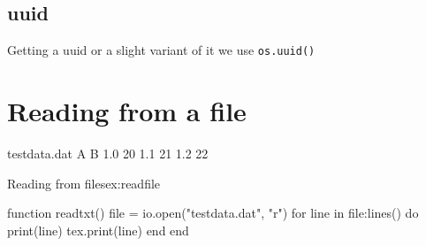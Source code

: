 \subsection{uuid}
Getting a uuid or a slight variant of it we use \lstinline!os.uuid()!

\section{Reading from a file}


\usepackage{luatextra}


\begin{filecontents}{testdata.dat}
  A  B
  1.0 20
  1.1 21
  1.2 22
\end{filecontents}

\begin{texexample}{Reading from files}{ex:readfile}
\begin{luacode}
  function readtxt()
    file = io.open("testdata.dat", "r")
    for line in file:lines() do
      print(line)
      tex.print(line)
    end
  end
\end{luacode}
\end{texexample}

\MakePercentIgnore












